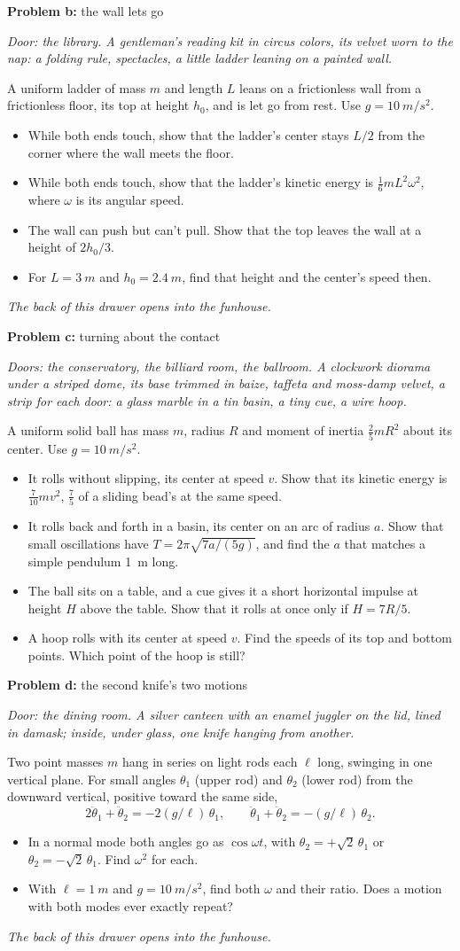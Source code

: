 \documentclass[11pt]{article}
\newcommand{\scene}[1]{\par{\itshape #1}\par}
\newcommand{\problem}[2]{\par\medskip\textbf{Problem #1:} #2\par\nopagebreak}
\newenvironment{parts}{\begin{itemize}[leftmargin=3.4em,labelwidth=2.8em,labelsep=0.6em,align=left,itemsep=2pt,topsep=3pt]}{\end{itemize}}
\newcommand{\pt}[1]{\item[\textbf{#1}]}
\begin{document}
\problem{b}{the wall lets go}
\scene{Door: the library. A gentleman's reading kit in circus colors, its velvet worn to the nap: a folding rule, spectacles, a little ladder leaning on a painted wall.}
A uniform ladder of mass $m$ and length $L$ leans on a frictionless wall from a frictionless floor, its top at height $h_0$, and is let go from rest. Use $g = \SI{10}{m/s^2}$.
\begin{parts}
\pt{b-1} While both ends touch, show that the ladder's center stays $L/2$ from the corner where the wall meets the floor.
\pt{b-2} While both ends touch, show that the ladder's kinetic energy is $\frac16 mL^2\omega^2$, where $\omega$ is its angular speed.
\pt{b-3} The wall can push but can't pull. Show that the top leaves the wall at a height of $2h_0/3$.
\pt{b-4} For $L = \SI{3}{m}$ and $h_0 = \SI{2.4}{m}$, find that height and the center's speed then.
\end{parts}
\scene{The back of this drawer opens into the funhouse.}

\problem{c}{turning about the contact}
\scene{Doors: the conservatory, the billiard room, the ballroom. A clockwork diorama under a striped dome, its base trimmed in baize, taffeta and moss-damp velvet, a strip for each door: a glass marble in a tin basin, a tiny cue, a wire hoop.}
A uniform solid ball has mass $m$, radius $R$ and moment of inertia $\frac25 mR^2$ about its center. Use $g = \SI{10}{m/s^2}$.
\begin{parts}
\pt{c-1} It rolls without slipping, its center at speed $v$. Show that its kinetic energy is $\frac{7}{10}mv^2$, $\frac75$ of a sliding bead's at the same speed.
\pt{c-2} It rolls back and forth in a basin, its center on an arc of radius $a$. Show that small oscillations have $T = 2\pi\sqrt{7a/(5g)}$, and find the $a$ that matches a simple pendulum \SI{1}{m} long.
\pt{c-3} The ball sits on a table, and a cue gives it a short horizontal impulse at height $H$ above the table. Show that it rolls at once only if $H = 7R/5$.
\pt{c-4} A hoop rolls with its center at speed $v$. Find the speeds of its top and bottom points. Which point of the hoop is still?
\end{parts}

\problem{d}{the second knife's two motions}
\scene{Door: the dining room. A silver canteen with an enamel juggler on the lid, lined in damask; inside, under glass, one knife hanging from another.}
Two point masses $m$ hang in series on light rods each $\ell$ long, swinging in one vertical plane. For small angles $\theta_1$ (upper rod) and $\theta_2$ (lower rod) from the downward vertical, positive toward the same side,
\[ 2\ddot\theta_1 + \ddot\theta_2 = -2(g/\ell)\,\theta_1, \qquad \ddot\theta_1 + \ddot\theta_2 = -(g/\ell)\,\theta_2. \]
\begin{parts}
\pt{d-1} In a normal mode both angles go as $\cos\omega t$, with $\theta_2 = +\sqrt2\,\theta_1$ or $\theta_2 = -\sqrt2\,\theta_1$. Find $\omega^2$ for each.
\pt{d-2} With $\ell = \SI{1}{m}$ and $g = \SI{10}{m/s^2}$, find both $\omega$ and their ratio. Does a motion with both modes ever exactly repeat?
\end{parts}
\scene{The back of this drawer opens into the funhouse.}
\end{document}

